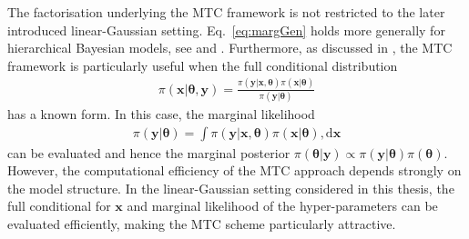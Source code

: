 \begin{mccorrection}
The factorisation underlying the MTC framework is not restricted to the later introduced linear-Gaussian setting. Eq.~\ref{eq:margGen} holds more generally for hierarchical Bayesian models, see \cite[Lemma 2]{fox2016fast} and \cite{norton2018sampling}.
Furthermore, as discussed in \cite{norton2018sampling}, the MTC framework is particularly useful when the full conditional distribution
\begin{align*}
	\pi(\bm{x}|\bm{\theta},\bm{y})
	=
	\frac{\pi(\bm{y}|\bm{x},\bm{\theta})\pi(\bm{x}|\bm{\theta})}
	{\pi(\bm{y}|\bm{\theta})}
\end{align*}
has a known form. In this case, the marginal likelihood
\begin{align*}
	\pi(\bm{y}|\bm{\theta})
	=
	\int
	\pi(\bm{y}|\bm{x},\bm{\theta})
	\pi(\bm{x}|\bm{\theta})
	,\mathrm{d}\bm{x}
\end{align*}
can be evaluated and hence the marginal posterior $	\pi(\bm{\theta} |   \bm{y}) \propto 	\pi(\bm{y}|\bm{\theta}) 	\pi(\bm{\theta}) $.
However, the computational efficiency of the MTC approach depends strongly on the model structure. In the linear-Gaussian setting considered in this thesis, the full conditional for $\bm{x}$ and marginal likelihood of the hyper-parameters can be evaluated efficiently, making the MTC scheme particularly attractive. 
\end{mccorrection}





